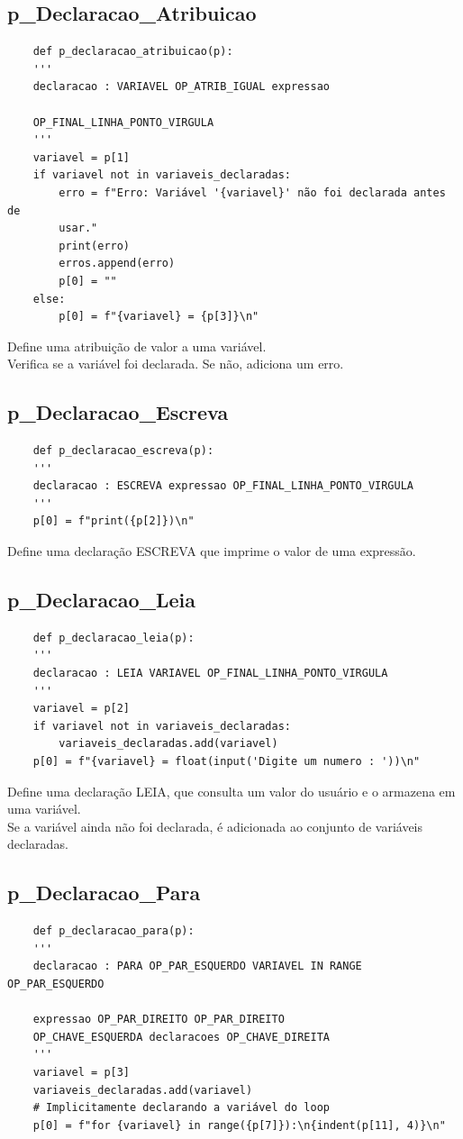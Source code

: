 \documentclass[a4paper,12pt]{article}
\begin{document}
\subsection{p\_Declaracao\_Atribuicao}
\begin{verbatim}
    def p_declaracao_atribuicao(p):
    '''
    declaracao : VARIAVEL OP_ATRIB_IGUAL expressao 
    
    OP_FINAL_LINHA_PONTO_VIRGULA
    '''
    variavel = p[1]
    if variavel not in variaveis_declaradas:
        erro = f"Erro: Variável '{variavel}' não foi declarada antes de 
        usar."
        print(erro)
        erros.append(erro)
        p[0] = ""
    else:
        p[0] = f"{variavel} = {p[3]}\n"
\end{verbatim}
Define uma atribuição de valor a uma variável.\\
Verifica se a variável foi declarada. Se não, adiciona um erro.

\subsection{p\_Declaracao\_Escreva}
\begin{verbatim}
    def p_declaracao_escreva(p):
    '''
    declaracao : ESCREVA expressao OP_FINAL_LINHA_PONTO_VIRGULA
    '''
    p[0] = f"print({p[2]})\n"
\end{verbatim}
Define uma declaração ESCREVA que imprime o valor de uma expressão.

\subsection{p\_Declaracao\_Leia}
\begin{verbatim}
    def p_declaracao_leia(p):
    '''
    declaracao : LEIA VARIAVEL OP_FINAL_LINHA_PONTO_VIRGULA
    '''
    variavel = p[2]
    if variavel not in variaveis_declaradas:
        variaveis_declaradas.add(variavel)
    p[0] = f"{variavel} = float(input('Digite um numero : '))\n"
\end{verbatim}
Define uma declaração LEIA, que consulta um valor do usuário e o 
armazena em uma variável.\\
Se a variável ainda não foi declarada, é adicionada ao conjunto de 
variáveis declaradas.

\subsection{p\_Declaracao\_Para}

\begin{verbatim}
    def p_declaracao_para(p):
    '''
    declaracao : PARA OP_PAR_ESQUERDO VARIAVEL IN RANGE OP_PAR_ESQUERDO 
    
    expressao OP_PAR_DIREITO OP_PAR_DIREITO 
    OP_CHAVE_ESQUERDA declaracoes OP_CHAVE_DIREITA
    '''
    variavel = p[3]
    variaveis_declaradas.add(variavel)  
    # Implicitamente declarando a variável do loop
    p[0] = f"for {variavel} in range({p[7]}):\n{indent(p[11], 4)}\n"
\end{verbatim}
\end{document}
